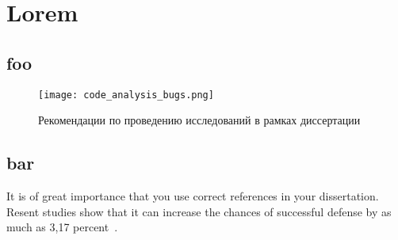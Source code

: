 \chapter{Lorem}

\section{foo}

\blindtext

\begin{figure}[htbp]
\centering
\texttt{[image: code\_analysis\_bugs.png]}
\caption{Рекомендации по проведению исследований в рамках диссертации}%
\label{fig:how-to-do-research}
\end{figure}

\Blindtext

\section{bar}

\blindtext
It is of great importance that you use correct references in your dissertation.
Resent studies show that it can increase the chances of successful defense
by as much as 3,17 percent~\cite{russian, java-book, ANTLR}.

\Blindtext
